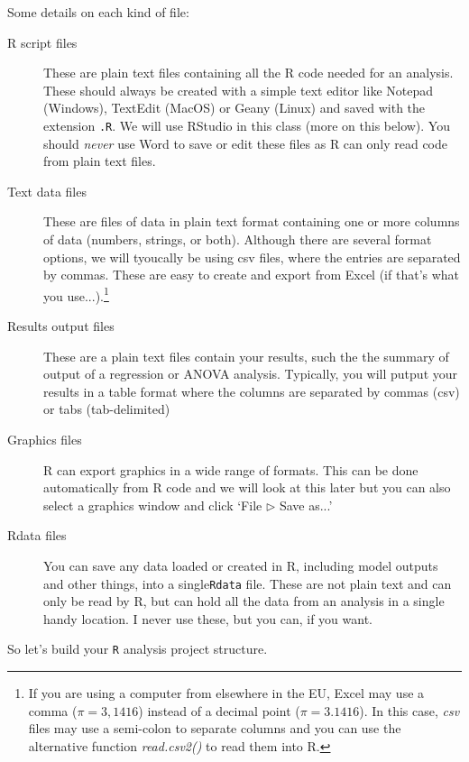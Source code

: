 Some details on each kind of file:
\begin{description}

\item [R script files] These are plain text files containing all the R 
code needed for an analysis. These should always be created with a 
simple text editor like Notepad (Windows), TextEdit (MacOS) or Geany 
(Linux) and saved with the extension {\tt *.R}. We will use RStudio in 
this class (more on this below). You should {\it never} use Word to 
save or edit these files as R can only read code from plain text files. 
 
\item [Text data files] These are files of data in plain text format 
containing one or more columns of data (numbers, strings, or both). 
Although there are several format options, we will tyoucally be using 
csv files, where the entries are separated by commas. These are easy to 
create and export from Excel (if that's what you use...).\footnote{If 
you are using a computer from elsewhere in the EU, Excel may use a 
comma ($\pi=3,1416$) instead of a decimal point ($\pi=3.1416$). In this 
case, {\it csv} files may use a semi-colon to separate columns and you 
can use the alternative function {\it read.csv2()} to read them into 
R.} 

\item [Results output files] These are a plain text files contain your 
results, such the the summary of output of a regression or ANOVA  
analysis. Typically, you will putput your results in a table format 
where the columns are separated by commas (csv) or tabs 
(tab-delimited) 

\item [Graphics files] R can export graphics in a wide range of 
formats. This can be done automatically from R code and we will look at 
this later but you can also select a graphics window and click `File 
$\triangleright$ Save as...'

\item [Rdata files] You can save any data loaded or created in R, 
including model outputs and other things, into a single{\tt Rdata} 
file. These are not plain text and can only be read by R, but can hold 
all the data from an analysis in a single handy location. I never use 
these, but you can, if you want.  

\end{description}

So let's build your {\tt R} analysis project structure. 

